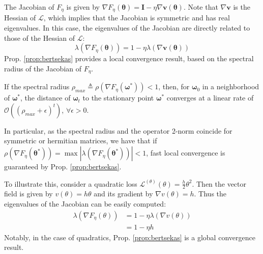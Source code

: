 \documentclass{article}
\renewcommand{\vec}[1]{\ensuremath{\boldsymbol{#1}}}
\newcommand{\mat}[1]{\ensuremath{\boldsymbol{#1}}}
\newcommand{\btheta}[0]{\ensuremath{\boldsymbol{\theta}}}
\begin{document}
The Jacobian of $F_\eta$ is given by $\nabla F_\eta(\btheta) = \mat{I} - \eta \nabla \vec{v}(\btheta)$. Note that $\nabla \vec{v}$ is the Hessian of $\mathcal{L}$, which implies that the Jacobian is symmetric and has real eigenvalues. In this case, the eigenvalues of the Jacobian are directly related to those of the Hessian of $\mathcal{L}$:
\begin{equation}
    \lambda (\nabla F_\eta (\btheta)) = 1 - \eta \lambda(\nabla \vec{v} (\btheta))
\end{equation}
Prop. \ref{prop:bertsekas} provides a local convergence result, based on the spectral radius of the Jacobian of $F_\eta$.

\begin{prop} \label{prop:bertsekas}
If the spectral radius $\rho_{max} \triangleq \rho (\nabla F_\eta (\vec{\omega}^*)) < 1$, then, for $\vec{\omega}_0$ in a neighborhood of $\vec{\omega}^*$, the distance of $\vec{\omega}_t$ to the stationary point $\vec{\omega}^*$ converges at a linear rate of $\mathcal{O}\left(\left(\rho_{max} + \epsilon \right)^t\right)$, $\forall \epsilon > 0$.
\end{prop}
In particular, as the spectral radius and the operator 2-norm coincide for symmetric or hermitian matrices, we have that if $\rho (\nabla F_\eta (\btheta^*)) = \max |\lambda (\nabla F_\eta (\btheta^*))| < 1$, fast local convergence is guaranteed by Prop. \ref{prop:bertsekas}.
\par
To illustrate this, consider a quadratic loss $\mathcal{L}^{(\theta)}(\theta) = \frac{h}{2} \theta^2$. Then the vector field is given by $v(\theta) = h\theta$ and its gradient by $\nabla v(\theta) = h$. Thus the eigenvalues of the Jacobian can be easily computed:
\begin{align}
    \lambda(\nabla F_\eta (\theta)) &= 1-\eta \lambda(\nabla v(\theta)) \nonumber \\
    &= 1 -\eta h
\end{align}
Notably, in the case of quadratics, Prop. \ref{prop:bertsekas} is a global convergence result. 
\end{document}
